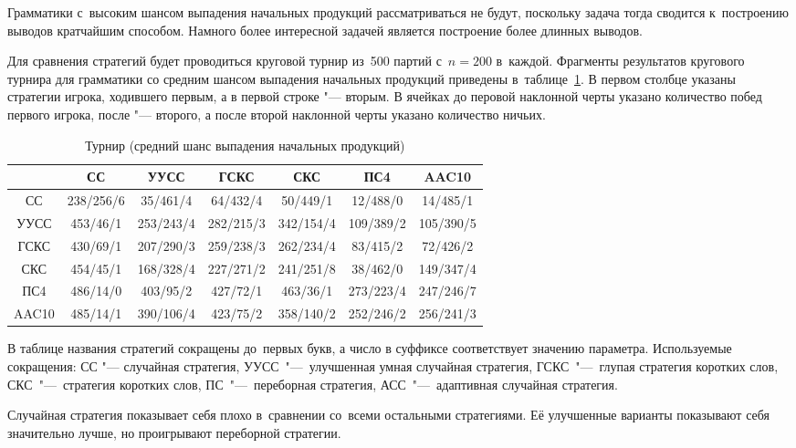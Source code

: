 \documentclass{csmathnotes}
\begin{document}
Грамматики с~высоким шансом выпадения начальных продукций рассматриваться не будут, поскольку задача тогда сводится к~построению выводов кратчайшим способом. Намного более интересной задачей является построение более длинных выводов.

Для сравнения стратегий будет проводиться круговой турнир из~500 партий с~$n=200$ в~каждой. Фрагменты результатов кругового турнира для грамматики со средним шансом выпадения начальных продукций приведены в~таблице~\ref{table:highfreq}. В первом столбце указаны стратегии игрока, ходившего первым, а в первой строке "--- вторым. В ячейках до перовой наклонной черты указано количество побед первого игрока, после "--- второго, а после второй наклонной черты указано количество ничьих.

\begin{table}[h!]
	\centering
	\small
	\setlength
	\tabcolsep{1.6pt}
	\caption{Турнир (средний шанс выпадения начальных продукций)}
	\label{table:highfreq}
	\begin{tabular}{| c | c | c | c | c | c | c |}
		\hline
		      & СС        & УУСС      & ГСКС      & СКС       & ПС4       & AAC10     \\ \hline
		СС    & 238/256/6 & 35/461/4  & 64/432/4  & 50/449/1  & 12/488/0  & 14/485/1  \\ \hline
		УУСС  & 453/46/1  & 253/243/4 & 282/215/3 & 342/154/4 & 109/389/2 & 105/390/5 \\ \hline
		ГСКС  & 430/69/1  & 207/290/3 & 259/238/3 & 262/234/4 & 83/415/2  & 72/426/2  \\ \hline
		СКС   & 454/45/1  & 168/328/4 & 227/271/2 & 241/251/8 & 38/462/0  & 149/347/4 \\ \hline
		ПС4   & 486/14/0  & 403/95/2  & 427/72/1  & 463/36/1  & 273/223/4 & 247/246/7 \\ \hline
		AAC10 & 485/14/1  & 390/106/4 & 423/75/2  & 358/140/2 & 252/246/2 & 256/241/3 \\ \hline
	\end{tabular}
\end{table}

В таблице названия стратегий сокращены до~первых букв, а число в суффиксе соответствует значению параметра. Используемые сокращения: СС "--- случайная стратегия,  УУСС~"---~улучшенная умная случайная стратегия, ГСКС~"---~глупая стратегия коротких слов, СКС~"---~стратегия коротких слов, ПС~"---~переборная стратегия, АСС~"---~адаптивная случайная стратегия.

Случайная стратегия показывает себя плохо в~сравнении со~всеми остальными стратегиями. Её улучшенные варианты показывают себя значительно лучше, но проигрывают переборной стратегии.
\end{document}
